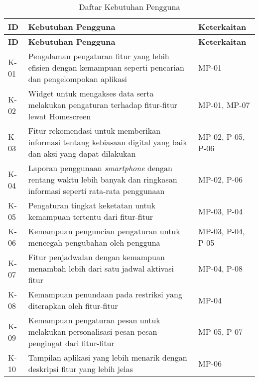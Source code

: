 \RaggedLeft
\begin{small}
\begin{longtable}[c]{|W{c}{0.07\textwidth}|>{\ccnormspacing}m{0.67\textwidth}|>{\ccnormspacingcenter}m{0.17\textwidth}|}
  \caption{Daftar Kebutuhan Pengguna}
  \label{tab:daftar_kebutuhan} \\
  \hline {}
  \textbf{ID} & \centering\textbf{Kebutuhan Pengguna} & \textbf{Keterkaitan} \\ \hline \endfirsthead
  \hline {}
  \textbf{ID} & \centering\textbf{Kebutuhan Pengguna} & \textbf{Keterkaitan} \\ \hline \endhead

  \hline \endfoot

  K-01  & Pengalaman pengaturan fitur yang lebih efisien dengan kemampuan seperti pencarian dan pengelompokan aplikasi & MP-01 \\ \hline
  K-02  & Widget untuk mengakses data serta melakukan pengaturan terhadap fitur-fitur lewat Homescreen & MP-01, MP-07 \\ \hline
  K-03  & Fitur rekomendasi untuk memberikan informasi tentang kebiasaan digital yang baik dan aksi yang dapat dilakukan & MP-02, P-05, P-06 \\ \hline
  K-04  & Laporan penggunaan \textit{smartphone} dengan rentang waktu lebih banyak dan ringkasan informasi seperti rata-rata penggunaan & MP-02, P-06 \\ \hline
  K-05  & Pengaturan tingkat keketatan untuk kemampuan tertentu dari fitur-fitur & MP-03, P-04 \\ \hline
  K-06  & Kemampuan penguncian pengaturan untuk mencegah pengubahan oleh pengguna & MP-03, P-04, P-05 \\ \hline
  K-07  & Fitur penjadwalan dengan kemampuan menambah lebih dari satu jadwal aktivasi fitur & MP-04, P-08 \\ \hline
  K-08  & Kemampuan penundaan pada restriksi yang diterapkan oleh fitur-fitur & MP-04 \\ \hline
  K-09  & Kemampuan pengaturan pesan untuk melakukan personalisasi pesan-pesan pengingat dari fitur-fitur & MP-05, P-07 \\ \hline
  K-10  & Tampilan aplikasi yang lebih menarik dengan deskripsi fitur yang lebih jelas & MP-06 \\ \hline
\end{longtable}
\end{small}
\justifying
\FloatBarrier

\newpage

